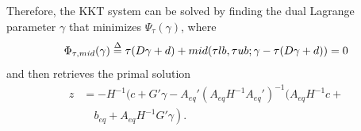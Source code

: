 \documentclass[journal]{IEEEtran}
\begin{document}
Therefore, the KKT system can be solved by finding the dual Lagrange parameter $\gamma$ that minimizes ${\Psi _\tau }\left( \gamma  \right)$, where
\begin{equation}\label{pwaf}
{\Phi _{\tau ,mid}}(\gamma )  \buildrel \Delta \over =  \tau (D\gamma  + d) + mid(\tau lb,\tau ub;\gamma  - \tau (D\gamma  + d)) = 0
\end{equation}
and then retrieves the primal solution
\begin{equation}\label{uans}
\begin{aligned}
z &=  - H^{ - 1} (c + G'{\gamma}  - {A_{eq}'}{{ ( {{A_{eq}}{H^{ - 1}}{A_{eq}'}} )}^{ - 1}} \left.( A_{eq}H^{ - 1}c+\right.\\
 &\quad\left. b_{eq} + A_{eq}H^{ - 1}G'{\gamma}\right).
\end{aligned}
\end{equation}
\end{document}
